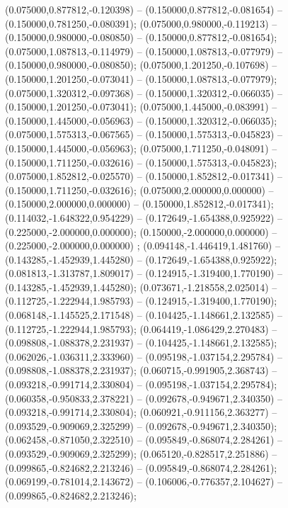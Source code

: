  (0.075000,0.877812,-0.120398) -- (0.150000,0.877812,-0.081654) -- (0.150000,0.781250,-0.080391);
 (0.075000,0.980000,-0.119213) -- (0.150000,0.980000,-0.080850) -- (0.150000,0.877812,-0.081654);
 (0.075000,1.087813,-0.114979) -- (0.150000,1.087813,-0.077979) -- (0.150000,0.980000,-0.080850);
 (0.075000,1.201250,-0.107698) -- (0.150000,1.201250,-0.073041) -- (0.150000,1.087813,-0.077979);
 (0.075000,1.320312,-0.097368) -- (0.150000,1.320312,-0.066035) -- (0.150000,1.201250,-0.073041);
 (0.075000,1.445000,-0.083991) -- (0.150000,1.445000,-0.056963) -- (0.150000,1.320312,-0.066035);
 (0.075000,1.575313,-0.067565) -- (0.150000,1.575313,-0.045823) -- (0.150000,1.445000,-0.056963);
 (0.075000,1.711250,-0.048091) -- (0.150000,1.711250,-0.032616) -- (0.150000,1.575313,-0.045823);
 (0.075000,1.852812,-0.025570) -- (0.150000,1.852812,-0.017341) -- (0.150000,1.711250,-0.032616);
 (0.075000,2.000000,0.000000) -- (0.150000,2.000000,0.000000) -- (0.150000,1.852812,-0.017341);
 (0.114032,-1.648322,0.954229) -- (0.172649,-1.654388,0.925922) -- (0.225000,-2.000000,0.000000);
 (0.150000,-2.000000,0.000000) -- (0.225000,-2.000000,0.000000) ;
 (0.094148,-1.446419,1.481760) -- (0.143285,-1.452939,1.445280) -- (0.172649,-1.654388,0.925922);
 (0.081813,-1.313787,1.809017) -- (0.124915,-1.319400,1.770190) -- (0.143285,-1.452939,1.445280);
 (0.073671,-1.218558,2.025014) -- (0.112725,-1.222944,1.985793) -- (0.124915,-1.319400,1.770190);
 (0.068148,-1.145525,2.171548) -- (0.104425,-1.148661,2.132585) -- (0.112725,-1.222944,1.985793);
 (0.064419,-1.086429,2.270483) -- (0.098808,-1.088378,2.231937) -- (0.104425,-1.148661,2.132585);
 (0.062026,-1.036311,2.333960) -- (0.095198,-1.037154,2.295784) -- (0.098808,-1.088378,2.231937);
 (0.060715,-0.991905,2.368743) -- (0.093218,-0.991714,2.330804) -- (0.095198,-1.037154,2.295784);
 (0.060358,-0.950833,2.378221) -- (0.092678,-0.949671,2.340350) -- (0.093218,-0.991714,2.330804);
 (0.060921,-0.911156,2.363277) -- (0.093529,-0.909069,2.325299) -- (0.092678,-0.949671,2.340350);
 (0.062458,-0.871050,2.322510) -- (0.095849,-0.868074,2.284261) -- (0.093529,-0.909069,2.325299);
 (0.065120,-0.828517,2.251886) -- (0.099865,-0.824682,2.213246) -- (0.095849,-0.868074,2.284261);
 (0.069199,-0.781014,2.143672) -- (0.106006,-0.776357,2.104627) -- (0.099865,-0.824682,2.213246);
